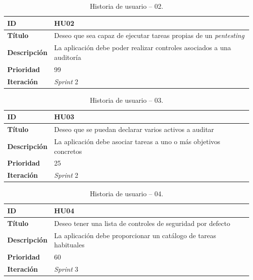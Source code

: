 \begin{table}[H]
    \begin{center}
        \begin{tabularx}{\textwidth}{| l | X |}
            \hline
            \textbf{ID}             & HU02 \\ \hline
            \textbf{Título}         & Deseo que sea capaz de ejecutar tareas propias de un \textit{pentesting} \\ \hline
            \textbf{Descripción}    & La aplicación debe poder realizar controles asociados a una auditoría \\ \hline
            \textbf{Prioridad}      & 99 \\ \hline
            \textbf{Iteración}      & \textit{Sprint} 2\\ \hline
        \end{tabularx}
    \end{center}
    \caption{Historia de usuario -- 02.}
    \label{tab:hu02}
\end{table}

\begin{table}[H]
    \begin{center}
        \begin{tabularx}{\textwidth}{| l | X |}
            \hline
            \textbf{ID}             & HU03 \\ \hline
            \textbf{Título}         & Deseo que se puedan declarar varios activos a auditar \\ \hline
            \textbf{Descripción}    & La aplicación debe asociar tareas a uno o más objetivos concretos \\ \hline
            \textbf{Prioridad}      & 25 \\ \hline
            \textbf{Iteración}      & \textit{Sprint} 2\\ \hline
        \end{tabularx}
    \end{center}
    \caption{Historia de usuario -- 03.}
    \label{tab:hu03}
\end{table}

\begin{table}[H]
    \begin{center}
        \begin{tabularx}{\textwidth}{| l | X |}
            \hline
            \textbf{ID}             & HU04 \\ \hline
            \textbf{Título}         & Deseo tener una lista de controles de seguridad por defecto \\ \hline
            \textbf{Descripción}    & La aplicación debe proporcionar un catálogo de tareas habituales \\ \hline
            \textbf{Prioridad}      & 60 \\ \hline
            \textbf{Iteración}      & \textit{Sprint} 3\\ \hline
        \end{tabularx}
    \end{center}
    \caption{Historia de usuario -- 04.}
    \label{tab:hu04}
\end{table}

